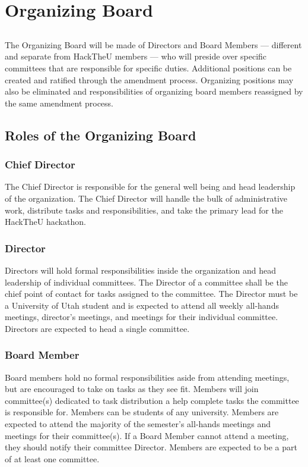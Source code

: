 \documentclass[12pt]{article}
\begin{document}
\section{Organizing Board}

\subsection{} The Organizing Board will be made of Directors and Board Members --- different and separate from HackTheU members --- who will preside over specific committees that are 
responsible for specific duties. Additional positions can be created and ratified through
the amendment process. Organizing positions may also be eliminated and responsibilities
of organizing board members reassigned by the same amendment process.

\subsection{Roles of the Organizing Board}
\subsubsection{Chief Director}
\noindent The Chief Director is responsible for the general well being and head leadership 
of the organization. 
The Chief Director will handle the bulk of administrative work, 
distribute tasks and responsibilities,
and take the primary lead for the HackTheU hackathon.

\subsubsection{Director}
\noindent Directors will hold formal responsibilities inside the organization and 
head leadership of individual committees. The Director of a committee shall be the chief
point of contact for tasks assigned to the committee. The Director must be a University
of Utah student and is expected to attend all weekly all-hands meetings, director's meetings,
and meetings for their individual committee.
Directors are expected to head a single committee.

\subsubsection{Board Member}
\noindent Board members hold no formal responsibilities aside from attending meetings,
but are encouraged to take on tasks as they see fit. Members will join committee(s)
dedicated to task distribution a help complete tasks the committee is responsible for.
Members can be students of any university. Members are expected to attend 
the majority of the semester's all-hands meetings
and meetings for their committee(s). If a Board Member cannot attend a meeting, they
should notify their committee Director. Members are expected to be a part of at least
one committee.
\end{document}
